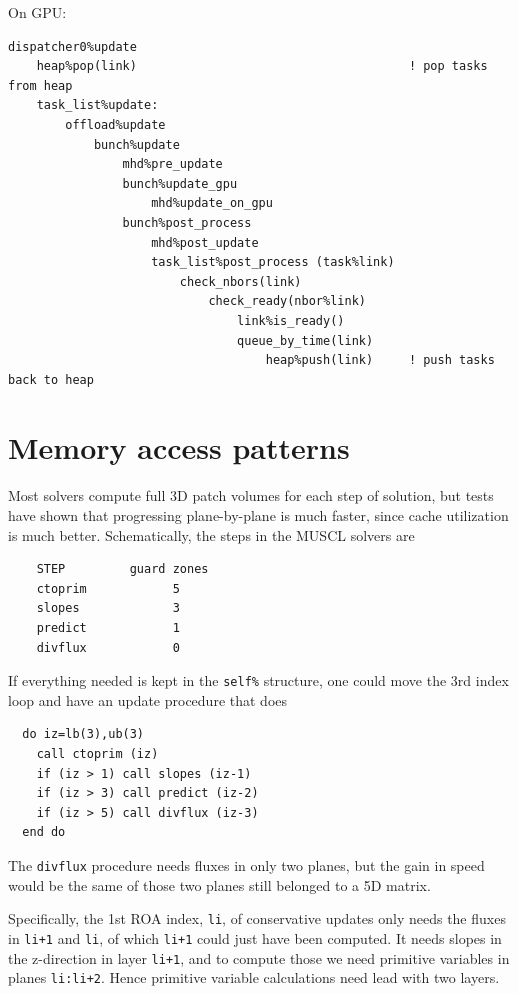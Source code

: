 \documentclass[paper=a4,fontsize=11pt]{scrartcl}
\numberwithin{equation}{section}		%
\numberwithin{figure}{section}			%
\numberwithin{table}{section}				%
\newcommand{\codecolor}{\color{Blue}}
\begin{document}
On GPU:
{\small\codecolor\begin{verbatim}
dispatcher0%update
    heap%pop(link)                                      ! pop tasks from heap
    task_list%update:
        offload%update
            bunch%update
                mhd%pre_update
                bunch%update_gpu
                    mhd%update_on_gpu
                bunch%post_process
                    mhd%post_update
                    task_list%post_process (task%link)
                        check_nbors(link)
                            check_ready(nbor%link)
                                link%is_ready()
                                queue_by_time(link)
                                    heap%push(link)     ! push tasks back to heap
    \end{verbatim}}

\section{Memory access patterns}
Most solvers compute full 3D patch volumes for each step of solution, but tests have shown that progressing plane-by-plane is much faster, since cache utilization is much better.  Schematically, the steps in the MUSCL solvers are
\begin{verbatim}
    STEP         guard zones
    ctoprim            5
    slopes             3
    predict            1
    divflux            0
\end{verbatim}
If everything needed is kept in the \verb|self%| structure, one could move the 3rd index loop and have an update procedure that does
\begin{verbatim}
  do iz=lb(3),ub(3)
    call ctoprim (iz)
    if (iz > 1) call slopes (iz-1)
    if (iz > 3) call predict (iz-2)
    if (iz > 5) call divflux (iz-3)
  end do
\end{verbatim}
The \verb|divflux| procedure needs fluxes in only two planes, but the gain in speed would be the same of those two planes still belonged to a 5D matrix.

Specifically, the 1st ROA index, \verb|li|, of conservative updates only needs the fluxes in \verb|li+1| and \verb|li|, of which \verb|li+1| could just have been computed.  It needs slopes in the z-direction in layer \verb|li+1|, and to compute those we need primitive variables in planes \verb|li:li+2|.  Hence primitive variable calculations need lead with two layers.
\end{document}
